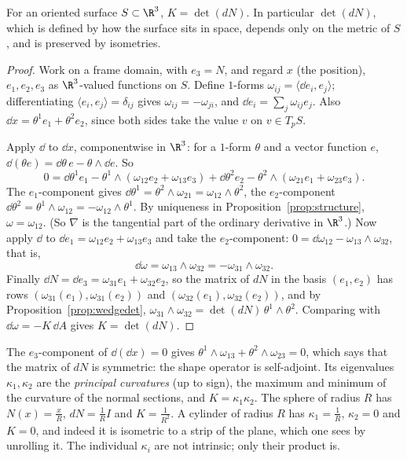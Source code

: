 \begin{theorem}\label{thm:egregium}
For an oriented surface $S\subset\R^3$, $K=\det(dN)$. In particular $\det(dN)$, which is defined by how the surface sits in space, depends only on the metric of
$S$, and is preserved by isometries.
\end{theorem}
\begin{proof}
Work on a frame domain, with $e_3=N$, and regard $x$ (the position), $e_1,e_2,e_3$ as $\R^3$-valued functions on $S$. Define $1$-forms $\omega_{ij}=\langle\dd e_i,e_j\rangle$;
differentiating $\langle e_i,e_j\rangle=\delta_{ij}$ gives $\omega_{ij}=-\omega_{ji}$, and $\dd e_i=\sum_j\omega_{ij}e_j$. Also $\dd x=\theta^1e_1+\theta^2e_2$, since both sides take the value $v$ on
$v\in T_pS$.

Apply $\dd$ to $\dd x$, componentwise in $\R^3$: for a $1$-form $\theta$ and a vector function $e$, $\dd(\theta e)=\dd\theta\,e-\theta\wedge\dd e$. So
\[
0=\dd\theta^1e_1-\theta^1\wedge(\omega_{12}e_2+\omega_{13}e_3)+\dd\theta^2e_2-\theta^2\wedge(\omega_{21}e_1+\omega_{23}e_3).
\]
The $e_1$-component gives $\dd\theta^1=\theta^2\wedge\omega_{21}=\omega_{12}\wedge\theta^2$, the $e_2$-component $\dd\theta^2=\theta^1\wedge\omega_{12}=-\omega_{12}\wedge\theta^1$. By uniqueness in
Proposition~\ref{prop:structure}, $\omega=\omega_{12}$. (So $\nabla$ is the tangential part of the ordinary derivative in $\R^3$.) Now apply $\dd$ to $\dd e_1=\omega_{12}e_2+\omega_{13}e_3$ and take the
$e_2$-component: $0=\dd\omega_{12}-\omega_{13}\wedge\omega_{32}$, that is,
\[
\dd\omega=\omega_{13}\wedge\omega_{32}=-\omega_{31}\wedge\omega_{32}.
\]
Finally $\dd N=\dd e_3=\omega_{31}e_1+\omega_{32}e_2$, so the matrix of $dN$ in the basis $(e_1,e_2)$ has rows $(\omega_{31}(e_1),\omega_{31}(e_2))$ and $(\omega_{32}(e_1),\omega_{32}(e_2))$, and
by Proposition~\ref{prop:wedgedet}, $\omega_{31}\wedge\omega_{32}=\det(dN)\,\theta^1\wedge\theta^2$. Comparing with $\dd\omega=-K\,\dd A$ gives $K=\det(dN)$.
\end{proof}

The $e_3$-component of $\dd(\dd x)=0$ gives $\theta^1\wedge\omega_{13}+\theta^2\wedge\omega_{23}=0$, which says that the matrix of $dN$ is symmetric: the shape operator is self-adjoint. Its
eigenvalues $\kappa_1,\kappa_2$ are the \emph{principal curvatures} (up to sign), the maximum and minimum of the curvature of the normal sections, and
$K=\kappa_1\kappa_2$. The sphere of radius $R$ has $N(x)=\frac xR$, $dN=\frac1RI$ and $K=\frac1{R^2}$. A cylinder of radius $R$ has $\kappa_1=\frac1R$, $\kappa_2=0$ and $K=0$, and
indeed it is isometric to a strip of the plane, which one sees by unrolling it. The individual $\kappa_i$ are not intrinsic; only their product is.


